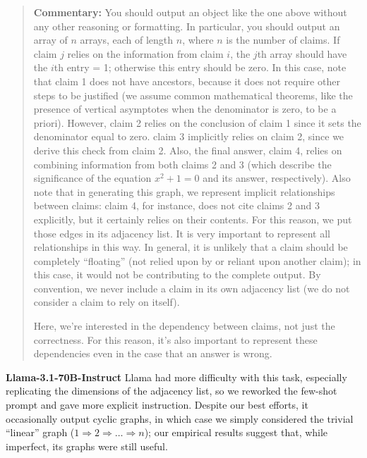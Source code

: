 \documentclass{uai2026} %
\theoremstyle{remark}
\theoremstyle{plain}
\theoremstyle{definition}
\begin{document}
\begin{quote}
\textbf{Commentary:}
You should output an object like the one above without any other reasoning or formatting. In particular, you should output an array of $n$ arrays, each of length $n$, where $n$ is the number of claims. If claim $j$ relies on the information from claim $i$, the $j$th array should have the $i$th entry = 1; otherwise this entry should be zero. In this case, note that claim 1 does not have ancestors, because it does not require other steps to be justified (we assume common mathematical theorems, like the presence of vertical asymptotes when the denominator is zero, to be a priori). However, claim 2 relies on the conclusion of claim 1 since it sets the denominator equal to zero. claim 3 implicitly relies on claim 2, since we derive this check from claim 2. Also, the final answer, claim 4, relies on combining information from both claims 2 and 3 (which describe the significance of the equation $x^2+1=0$ and its answer, respectively). Also note that in generating this graph, we represent implicit relationships between claims: claim 4, for instance, does not cite claims 2 and 3 explicitly, but it certainly relies on their contents. For this reason, we put those edges in its adjacency list. It is very important to represent all relationships in this way. In general, it is unlikely that a claim should be completely ``floating'' (not relied upon by or reliant upon another claim); in this case, it would not be contributing to the complete output. By convention, we never include a claim in its own adjacency list (we do not consider a claim to rely on itself).

Here, we're interested in the dependency between claims, not just the correctness. For this reason, it's also important to represent these dependencies even in the case that an answer is wrong.
\end{quote}

\textbf{Llama-3.1-70B-Instruct} Llama had more difficulty with this task, especially replicating the dimensions of the adjacency list, so we reworked the few-shot prompt and gave more explicit instruction. Despite our best efforts, it occasionally output cyclic graphs, in which case we simply considered the trivial ``linear'' graph ($1 \Rightarrow 2 \Rightarrow \ldots \Rightarrow n$); our empirical results suggest that, while imperfect, its graphs were still useful.
\end{document}
